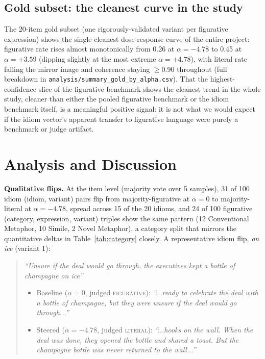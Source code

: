 \documentclass[11pt]{article}
\begin{document}
\subsection{Gold subset: the cleanest curve in the study}

The 20-item gold subset (one rigorously-validated variant per figurative expression)
shows the single cleanest dose-response curve of the entire project: figurative rate
rises almost monotonically from 0.26 at $\alpha=-4.78$ to 0.45 at $\alpha=+3.59$ (dipping
slightly at the most extreme $\alpha=+4.78$), with literal rate falling the mirror image
and coherence staying $\geq$0.90 throughout (full breakdown in
\texttt{analysis/summary\_gold\_by\_alpha.csv}). That the highest-confidence slice of the
figurative benchmark shows the cleanest trend in the whole study, cleaner than either the
pooled figurative benchmark or the idiom benchmark itself, is a meaningful positive
signal: it is not what we would expect if the idiom vector's apparent transfer to
figurative language were purely a benchmark or judge artifact.

\section{Analysis and Discussion}
\label{sec:analysis}

\textbf{Qualitative flips.} At the item level (majority vote over 5 samples), 31 of 100
idiom (idiom, variant) pairs flip from majority-figurative at $\alpha=0$ to
majority-literal at $\alpha=-4.78$, spread across 15 of the 20 idioms, and 24 of 100
figurative (category, expression, variant) triples show the same pattern (12
Conventional Metaphor, 10 Simile, 2 Novel Metaphor), a category split that mirrors the
quantitative deltas in Table~\ref{tab:category} closely. A representative idiom flip,
\emph{on ice} (variant 1):

\begin{quote}
\emph{``Unsure if the deal would go through, the executives kept a bottle of champagne on
ice''}
\begin{itemize}[nosep]
\item Baseline ($\alpha=0$, judged \textsc{figurative}): \emph{``...ready to celebrate the
deal with a bottle of champagne, but they were unsure if the deal would go through...''}
\item Steered ($\alpha=-4.78$, judged \textsc{literal}): \emph{``...hooks on the wall. When
the deal was done, they opened the bottle and shared a toast. But the champagne bottle
was never returned to the wall...''}
\end{itemize}
\end{quote}
\end{document}

